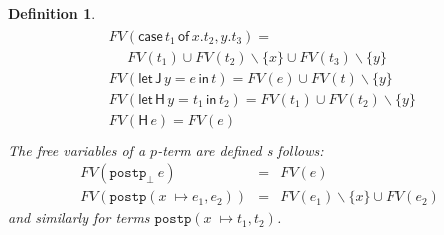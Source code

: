 \documentclass{lmcs}
\newtheorem{definition}[theorem]{Definition}
\newcommand{\DualLNLLogicnt}[1]{\mathit{#1}}
\newcommand{\DualLNLLogicmv}[1]{\mathit{#1}}
\begin{document}
\begin{definition}
\[\begin{array}{lll}
\begin{array}{lll}
    \,\,FV( \mathsf{case}\, \DualLNLLogicnt{t_{{\mathrm{1}}}} \,\mathsf{of}\, \DualLNLLogicmv{x} . \DualLNLLogicnt{t_{{\mathrm{2}}}} , \DualLNLLogicmv{y} . \DualLNLLogicnt{t_{{\mathrm{3}}}} ) = \\
    \,\,\,\,\,\,\,\,\,\,FV(t_1)\cup FV(t_2)\smallsetminus\{x\}\cup FV(t_3)\smallsetminus \{y\}\\
    \,\,FV( \mathsf{let}\,\mathsf{J}\, \DualLNLLogicmv{y}  =  \DualLNLLogicnt{e} \,\mathsf{in}\, \DualLNLLogicnt{t} ) = FV(e)\cup FV(t)\smallsetminus \{y\} \\
    \,\,FV( \mathsf{let}\,\mathsf{H}\, \DualLNLLogicmv{y}  =  \DualLNLLogicnt{t_{{\mathrm{1}}}} \,\mathsf{in}\, \DualLNLLogicnt{t_{{\mathrm{2}}}} ) = FV(\DualLNLLogicnt{t_{{\mathrm{1}}}})\cup FV(\DualLNLLogicnt{t_{{\mathrm{2}}}})\smallsetminus \{y\} \\
    \,\,FV( \mathsf{H}\, \DualLNLLogicnt{e} ) = FV(e)\\
  \end{array}
\end{array}
\]
The free variables of a $p$-term are defined s follows: 
\[
\begin{array}{rll}
  FV(\mathtt{postp}_{\bot}\ e) & = & FV(e)\\
  FV(\mathtt{postp} (x 􏰀\mapsto e_1, e_2)) & = & FV(e_1) \smallsetminus \{x\} \cup FV(e_2)
\end{array}
\] 
and similarly for terms $\mathtt{postp} (x 􏰀\mapsto t_1, t_2)$.
\end{definition}
\end{document}

